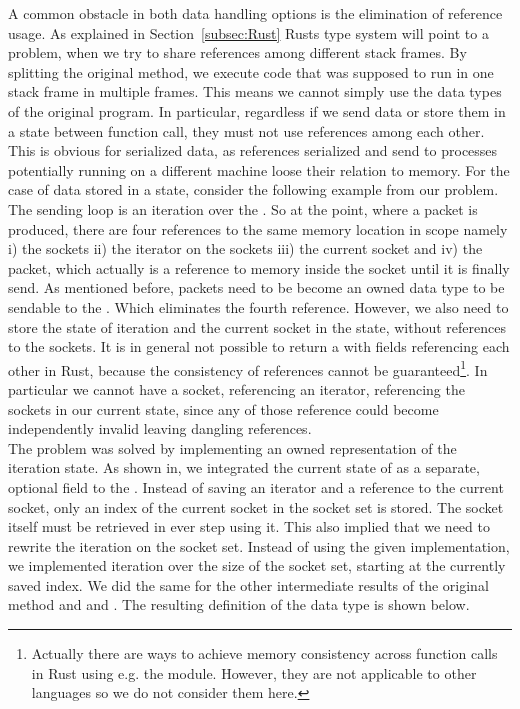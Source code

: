 A common obstacle in both data handling options is the elimination of reference usage. As explained in Section~\ref{subsec:Rust} Rusts type system will point to a problem, when we try to share references among different stack frames. By splitting the original  method, we execute code that was supposed to run in one stack frame in multiple frames. This means we cannot simply use the data types of the original program. In particular, regardless if we send data or store them in a state between function call, they must not use references among each other. This is obvious for serialized data, as references serialized and send to processes potentially running on a different machine loose their relation to memory. For the case of data stored in a state, consider the following example from our problem. The sending loop is an iteration over the . So at the point, where a packet is produced, there are four references to the same memory location in scope namely i) the sockets ii) the iterator on the sockets iii) the current socket and iv) the packet, which actually is a reference to memory inside the socket until it is finally send. As mentioned before, packets need to be become an owned data type to be sendable to the \dev{}. Which eliminates the fourth reference. However, we also need to store the state of iteration and the current socket in the state, without references to the sockets. It is in general not possible to return a  with fields referencing each other in Rust, because the consistency of references cannot be guaranteed\footnote{Actually there are ways to achieve memory consistency across function calls in Rust using e.g. the  module. However, they are not applicable to other languages so we do not consider them here.}. In particular we cannot have a socket, referencing an iterator, referencing the sockets in our current state, since any of those reference could become independently invalid leaving dangling references. \\

The problem was solved by implementing an owned representation of the iteration state. As shown in, we integrated the current state of  as a separate, optional field to the \stack{}. Instead of saving an iterator and a reference to the current socket, only an index of the current socket in the socket set is stored. The socket itself must be retrieved in ever step using it. This also implied that we need to rewrite the iteration on the socket set. Instead of using the given  implementation, we implemented iteration over the size of the socket set, starting at the currently saved index. We did the same for the other intermediate results of the original method  and  and . The resulting definition of the \stack{} data type is shown below. \\

